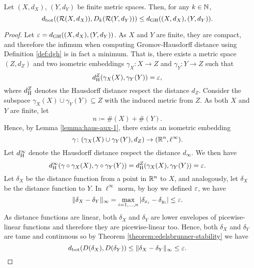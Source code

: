 \begin{theorem} \label{theorem:gh-stability}
    Let $ (X, d_X) $, $ (Y, d_Y) $ be finite metric spaces. Then, for any $ k \in \mathbb N$, 
    \begin{equation}
        d_{\operatorname{bot}}(  (\mathcal{R}(X, d_X)), D_k(\mathcal{R}(Y, d_Y))) \leq d_{\operatorname{GH}}((X, d_X), (Y, d_Y)).
    \end{equation}
\end{theorem}
\begin{proof}
    Let $ \varepsilon = d_{\operatorname{GH}}((X, d_X), (Y, d_Y)) $. As $ X $ and $ Y $ are finite, they are compact, and therefore the infimum when computing Gromov-Hausdorff distance using Definition \ref{def:dgh} is in fact a minimum. That is, there exists a metric space $ (Z, d_Z) $ and two isometric embeddings $ \gamma_X \colon X \to Z $ and $ \gamma_Y \colon Y \to Z $ such that
    \begin{equation}
        d_{\operatorname{H}}^Z(\gamma_X(X), \gamma_Y(Y)) = \varepsilon,
    \end{equation}
    where $ d_{\operatorname{H}}^Z $ denotes the Hausdorff distance respect the distance $ d_Z $. Consider the subspace $ \gamma_X(X) \cup \gamma_Y(Y) \subseteq Z $ with the induced metric from $ Z $. As both $ X $ and $ Y $ are finite, let
    \begin{equation}
        n \coloneq \#(X) + \#(Y). 
    \end{equation}
    Hence, by Lemma \ref{lemma:haus-aux-1}, there exists an isometric embedding
    \begin{equation}
        \gamma \colon (\gamma_X(X) \cup \gamma_Y(Y), d_Z) \to (\mathbb R^n, \ell^\infty).
    \end{equation}
    Let $ d_{\operatorname{H}}^\infty $ denote the Hausdorff distance respect the distance $ d_\infty $. We then have
    \begin{equation}
        d_{\operatorname{H}}^\infty(\gamma \circ \gamma_X(X), \gamma \circ \gamma_Y(Y)) = d_{\operatorname{H}}^Z(\gamma_X(X), \gamma_Y(Y)) = \varepsilon.
    \end{equation}
    Let $ \delta_X $ be the distance function from a point in $ \mathbb R^n $ to $ X $, and analogously, let $ \delta_X $ be the distance function to $ Y $. In $ \ell^\infty $ norm, by hoy we defined $\varepsilon$, we have
    \begin{equation}
        \| \delta_X - \delta_Y \|_\infty = \max_{i=1, \dots, n} | \delta_{x_i} - \delta_{y_i} | \leq \varepsilon.
    \end{equation}
    As distance functions are linear, both $ \delta_X $ and $ \delta_Y $ are lower envelopes of picewise-linear functions and therefore they are picewise-linear too. Hence,  both $ \delta_X $ and $ \delta_Y $ are tame and continuous so by Theorem \ref{theorem:edelsbrunner-stability} we have
    \begin{equation}
        d_{\operatorname{bot}}(D(\delta_X), D(\delta_Y)) \leq \| \delta_X - \delta_Y \|_\infty \leq \varepsilon.
    \end{equation}


\end{proof}

